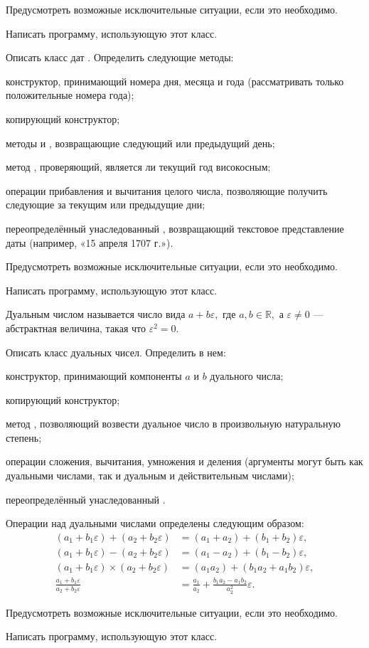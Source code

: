 Предусмотреть возможные исключительные ситуации, если это необходимо.

Написать программу, использующую этот класс.

\task Описать класс дат . Определить следующие методы:
\begin{itemize*}
\item конструктор, принимающий номера дня, месяца и года
  (рассматривать только положительные номера года);
\item копирующий конструктор;
\item методы  и , возвращающие следующий или
  предыдущий день;
\item метод , проверяющий, является ли текущий год
  високосным;
\item операции прибавления и вычитания целого числа, позволяющие
  получить следующие за текущим или предыдущие дни;
\item переопределённый унаследованный , возвращающий текстовое
  представление даты (например, «15 апреля 1707 г.»).
\end{itemize*}

Предусмотреть возможные исключительные ситуации, если это необходимо.

Написать программу, использующую этот класс.

\task Дуальным числом называется число вида $a+b\varepsilon,$ где $a,
b \in \mathbb{R},$ а $\varepsilon \neq 0$ — абстрактная величина,
такая что $\varepsilon^2 = 0$.

Описать класс  дуальных чисел. Определить в нем:
\begin{itemize*}
\item конструктор, принимающий компоненты $a$ и $b$ дуального числа;
\item копирующий конструктор;
\item метод , позволяющий возвести дуальное число в
  произвольную натуральную степень;
\item операции сложения, вычитания, умножения и деления (аргументы
  могут быть как дуальными числами, так и дуальным и действительным
  числами);
\item переопределённый унаследованный .
\end{itemize*}

Операции над дуальными числами определены следующим образом:
\begin{align*}
  (a_1+b_1\varepsilon) + (a_2+b_2\varepsilon) &= (a_1+a_2) + (b_1+b_2)\varepsilon,\\
  (a_1+b_1\varepsilon) - (a_2+b_2\varepsilon) &= (a_1-a_2) + (b_1-b_2)\varepsilon,\\
  (a_1+b_1\varepsilon) \times (a_2+b_2\varepsilon) &= (a_1a_2) + (b_1a_2+a_1b_2)\varepsilon,\\
  \frac{a_1+b_1\varepsilon}{a_2+b_2\varepsilon} &=
  \frac{a_1}{a_2} + \frac{b_1a_2-a_1b_2}{a_2^2}\varepsilon.
\end{align*}

Предусмотреть возможные исключительные ситуации, если это необходимо.

Написать программу, использующую этот класс.
